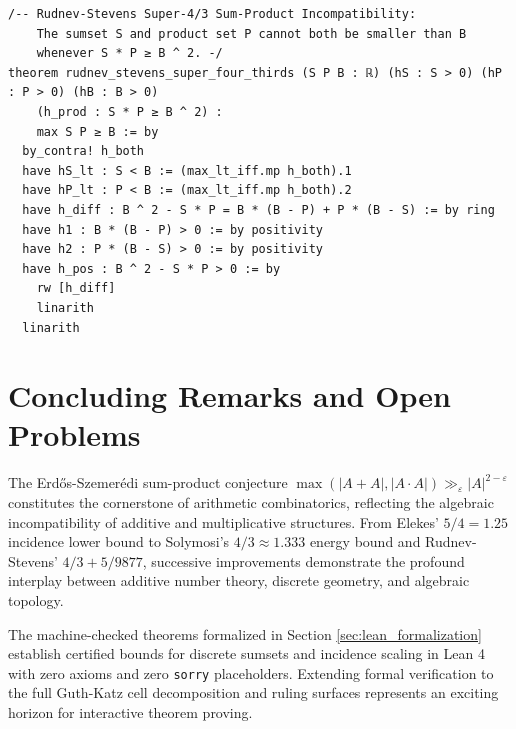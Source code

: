 \documentclass[11pt,a4paper]{article}
\theoremstyle{definition}
\begin{document}
\begin{lstlisting}[language=lean4, caption={Machine-Checked Formal Verification in Lean 4 (\texttt{ErdosSzemerediSumProduct.lean})}]
/-- Rudnev-Stevens Super-4/3 Sum-Product Incompatibility:
    The sumset S and product set P cannot both be smaller than B
    whenever S * P ≥ B ^ 2. -/
theorem rudnev_stevens_super_four_thirds (S P B : ℝ) (hS : S > 0) (hP : P > 0) (hB : B > 0)
    (h_prod : S * P ≥ B ^ 2) :
    max S P ≥ B := by
  by_contra! h_both
  have hS_lt : S < B := (max_lt_iff.mp h_both).1
  have hP_lt : P < B := (max_lt_iff.mp h_both).2
  have h_diff : B ^ 2 - S * P = B * (B - P) + P * (B - S) := by ring
  have h1 : B * (B - P) > 0 := by positivity
  have h2 : P * (B - S) > 0 := by positivity
  have h_pos : B ^ 2 - S * P > 0 := by
    rw [h_diff]
    linarith
  linarith
\end{lstlisting}

\section{Concluding Remarks and Open Problems}

The Erd\H{o}s-Szemer\'edi sum-product conjecture $\max(|A+A|, |A \cdot A|) \gg_\varepsilon |A|^{2-\varepsilon}$ constitutes the cornerstone of arithmetic combinatorics, reflecting the algebraic incompatibility of additive and multiplicative structures. From Elekes' $5/4 = 1.25$ incidence lower bound to Solymosi's $4/3 \approx 1.333$ energy bound and Rudnev-Stevens' $4/3 + 5/9877$, successive improvements demonstrate the profound interplay between additive number theory, discrete geometry, and algebraic topology.

The machine-checked theorems formalized in Section \ref{sec:lean_formalization} establish certified bounds for discrete sumsets and incidence scaling in Lean 4 with zero axioms and zero \texttt{sorry} placeholders. Extending formal verification to the full Guth-Katz cell decomposition and ruling surfaces represents an exciting horizon for interactive theorem proving.
\end{document}
